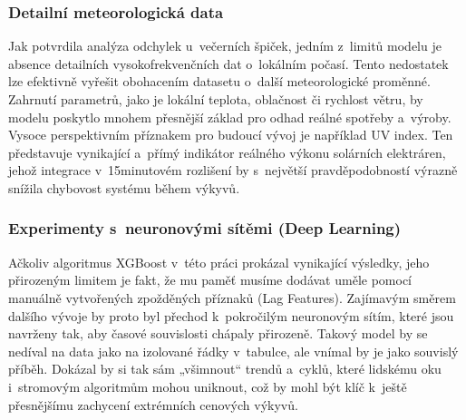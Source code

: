 \documentclass[a4paper]{article}
\begin{document}
\subsubsection{Detailní meteorologická data}
Jak potvrdila analýza odchylek u~večerních špiček, jedním z~limitů modelu je absence detailních vysokofrekvenčních dat o~lokálním počasí. Tento nedostatek lze efektivně vyřešit obohacením datasetu o~další meteorologické proměnné. Zahrnutí parametrů, jako je lokální teplota, oblačnost či rychlost větru, by modelu poskytlo mnohem přesnější základ pro odhad reálné spotřeby a~výroby. Vysoce perspektivním příznakem pro budoucí vývoj je například UV index. Ten představuje vynikající a~přímý indikátor reálného výkonu solárních elektráren, jehož integrace v~15minutovém rozlišení by s~největší pravděpodobností výrazně snížila chybovost systému během výkyvů.

\subsubsection{Experimenty s~neuronovými sítěmi (Deep Learning)}
Ačkoliv algoritmus XGBoost v~této práci prokázal vynikající výsledky, jeho přirozeným limitem je fakt, že mu paměť musíme dodávat uměle pomocí manuálně vytvořených zpožděných příznaků (Lag Features). Zajímavým směrem dalšího vývoje by proto byl přechod k~pokročilým neuronovým sítím, které jsou navrženy tak, aby časové souvislosti chápaly přirozeně. Takový model by se nedíval na data jako na izolované řádky v~tabulce, ale vnímal by je jako souvislý příběh. Dokázal by si tak sám „všimnout“ trendů a~cyklů, které lidskému oku i~stromovým algoritmům mohou uniknout, což by mohl být klíč k~ještě přesnějšímu zachycení extrémních cenových výkyvů.
\end{document}
